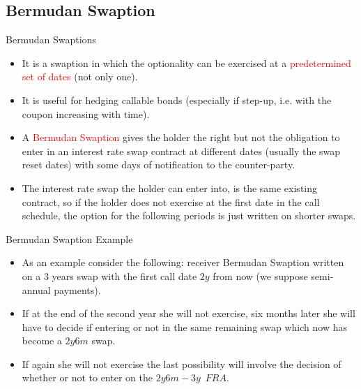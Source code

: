 \documentclass{beamer}
\begin{document}
\subsection{Bermudan Swaption}
\begin{frame}{Bermudan Swaptions}
\begin{itemize}
	\item<1-> It is a swaption in which the optionality can be exercised at a \textcolor{red}{predetermined set of dates} (not only one).
	\item<2-> It is useful for hedging callable bonds (especially if step-up, i.e. with the coupon increasing with time).
	\item<3-> A \textcolor{red}{Bermudan Swaption} gives the holder the right but not the obligation to enter in an interest rate swap contract at different dates (usually the swap reset dates) with some days of notification to the counter-party.
	\item<4-> The interest rate swap the holder can enter into, is the same existing contract, so if the holder does not exercise at the first date in the call schedule, the option for the following periods is just written on shorter swaps.
\end{itemize}
\end{frame}

\begin{frame}{Bermudan Swaption Example}
\begin{itemize}
	\item<1-> As an example consider the following: receiver Bermudan Swaption written on a 3 years swap with the first call date $2y$ from now (we suppose semi-annual payments).
	\item<2-> If at the end of the second year she will not exercise, six months later she will have to decide if entering or not in the same remaining swap which now has become a $2y6m$ swap.
	\item<3-> If again she will not exercise the last possibility will involve the decision of whether or not to enter on the $2y6m-3y$~$FRA$.
\end{itemize}
\end{frame}		
\end{document}
